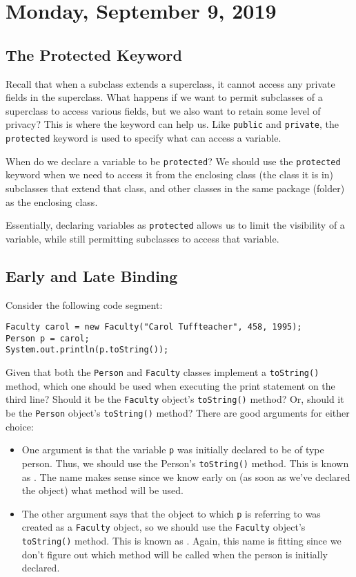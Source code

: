 \section{Monday, September 9, 2019}

\subsection{The Protected Keyword}
Recall that when a subclass extends a superclass, it cannot access any private fields in the superclass. What happens if we want to permit subclasses of a superclass to access various fields, but we also want to retain some level of privacy? This is where the  keyword can help us. Like \verb!public! and \verb!private!, the \verb!protected! keyword is used to specify what can access a variable. 


When do we declare a variable to be \verb!protected!? We should use the \verb!protected! keyword when we need to access it from the enclosing class (the class it is in) subclasses that extend that class, and other classes in the same package (folder) as the enclosing class. 

Essentially, declaring variables as \verb!protected! allows us to limit the visibility of a variable, while still permitting subclasses to access that variable.

\subsection{Early and Late Binding}


Consider the following code segment:

\begin{lstlisting}
Faculty carol = new Faculty("Carol Tuffteacher", 458, 1995);
Person p = carol;
System.out.println(p.toString());
\end{lstlisting}

Given that both the \verb!Person! and \verb!Faculty! classes implement a \verb!toString()! method, which one should be used when executing the print statement on the third line? Should it be the \verb!Faculty! object's \verb!toString()! method? Or, should it be the \verb!Person! object's \verb!toString()! method? There are good arguments for either choice:
\begin{itemize}
    \item One argument is that the variable \verb!p! was initially declared to be of type person. Thus, we should use the Person's \verb!toString()! method. This is known as . The name makes sense since we know early on (as soon as we've declared the object) what method will be used.
    \item The other argument says that the object to which \verb!p! is referring to was created as a \verb!Faculty! object, so we should use the \verb!Faculty! object's \verb!toString()! method. This is known as . Again, this name is fitting since we don't figure out which method will be called when the person is initially declared.
\end{itemize}

